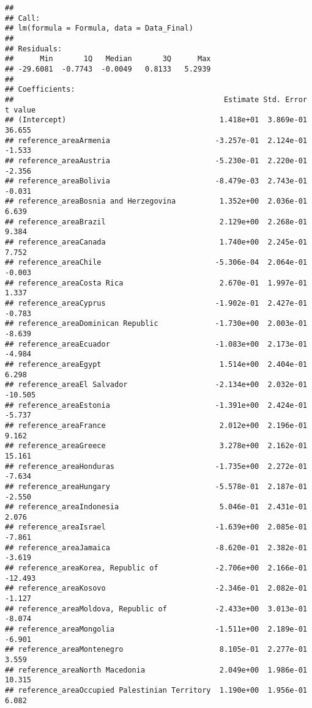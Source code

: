 \documentclass[
]{article}
\begin{document}
\begin{verbatim}
## 
## Call:
## lm(formula = Formula, data = Data_Final)
## 
## Residuals:
##      Min       1Q   Median       3Q      Max 
## -29.6081  -0.7743  -0.0049   0.8133   5.2939 
## 
## Coefficients:
##                                                Estimate Std. Error  t value
## (Intercept)                                   1.418e+01  3.869e-01   36.655
## reference_areaArmenia                        -3.257e-01  2.124e-01   -1.533
## reference_areaAustria                        -5.230e-01  2.220e-01   -2.356
## reference_areaBolivia                        -8.479e-03  2.743e-01   -0.031
## reference_areaBosnia and Herzegovina          1.352e+00  2.036e-01    6.639
## reference_areaBrazil                          2.129e+00  2.268e-01    9.384
## reference_areaCanada                          1.740e+00  2.245e-01    7.752
## reference_areaChile                          -5.306e-04  2.064e-01   -0.003
## reference_areaCosta Rica                      2.670e-01  1.997e-01    1.337
## reference_areaCyprus                         -1.902e-01  2.427e-01   -0.783
## reference_areaDominican Republic             -1.730e+00  2.003e-01   -8.639
## reference_areaEcuador                        -1.083e+00  2.173e-01   -4.984
## reference_areaEgypt                           1.514e+00  2.404e-01    6.298
## reference_areaEl Salvador                    -2.134e+00  2.032e-01  -10.505
## reference_areaEstonia                        -1.391e+00  2.424e-01   -5.737
## reference_areaFrance                          2.012e+00  2.196e-01    9.162
## reference_areaGreece                          3.278e+00  2.162e-01   15.161
## reference_areaHonduras                       -1.735e+00  2.272e-01   -7.634
## reference_areaHungary                        -5.578e-01  2.187e-01   -2.550
## reference_areaIndonesia                       5.046e-01  2.431e-01    2.076
## reference_areaIsrael                         -1.639e+00  2.085e-01   -7.861
## reference_areaJamaica                        -8.620e-01  2.382e-01   -3.619
## reference_areaKorea, Republic of             -2.706e+00  2.166e-01  -12.493
## reference_areaKosovo                         -2.346e-01  2.082e-01   -1.127
## reference_areaMoldova, Republic of           -2.433e+00  3.013e-01   -8.074
## reference_areaMongolia                       -1.511e+00  2.189e-01   -6.901
## reference_areaMontenegro                      8.105e-01  2.277e-01    3.559
## reference_areaNorth Macedonia                 2.049e+00  1.986e-01   10.315
## reference_areaOccupied Palestinian Territory  1.190e+00  1.956e-01    6.082

\end{verbatim}
\end{document}
